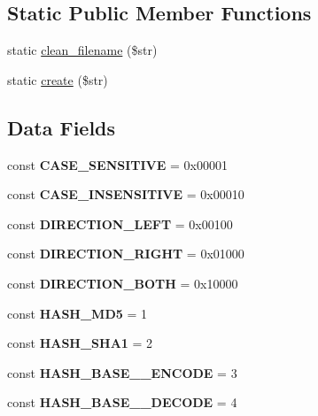 \subsection*{Static Public Member Functions}
\begin{DoxyCompactItemize}
\item 
static \hyperlink{class_string_a0379fa1d2b4237c37dfdec08861d99af}{clean\_\-filename} (\$str)
\item 
static \hyperlink{class_string_a961abbe56dd9e118c04e34b6f1882acb}{create} (\$str)
\end{DoxyCompactItemize}
\subsection*{Data Fields}
\begin{DoxyCompactItemize}
\item 
\hypertarget{class_string_aa0aa4956c348404eafb4c3c56f9b5f39}{
const {\bfseries CASE\_\-SENSITIVE} = 0x00001}
\label{class_string_aa0aa4956c348404eafb4c3c56f9b5f39}

\item 
\hypertarget{class_string_a026a296c95f3ab3b5b8e340396fcb839}{
const {\bfseries CASE\_\-INSENSITIVE} = 0x00010}
\label{class_string_a026a296c95f3ab3b5b8e340396fcb839}

\item 
\hypertarget{class_string_a139cc2d8b5c7daa8d248bc1ad6064b52}{
const {\bfseries DIRECTION\_\-LEFT} = 0x00100}
\label{class_string_a139cc2d8b5c7daa8d248bc1ad6064b52}

\item 
\hypertarget{class_string_af81c309d1263b5697174e60d5ec17278}{
const {\bfseries DIRECTION\_\-RIGHT} = 0x01000}
\label{class_string_af81c309d1263b5697174e60d5ec17278}

\item 
\hypertarget{class_string_a009c53f9b73b984845c4a55b1082168c}{
const {\bfseries DIRECTION\_\-BOTH} = 0x10000}
\label{class_string_a009c53f9b73b984845c4a55b1082168c}

\item 
\hypertarget{class_string_a56854fc2844da8f69ab256cd98245d9b}{
const {\bfseries HASH\_\-MD5} = 1}
\label{class_string_a56854fc2844da8f69ab256cd98245d9b}

\item 
\hypertarget{class_string_ae2edd4bdd282ab84d689621a4d9c699c}{
const {\bfseries HASH\_\-SHA1} = 2}
\label{class_string_ae2edd4bdd282ab84d689621a4d9c699c}

\item 
\hypertarget{class_string_a1a5d516139ee76150e07a8db2293e6e8}{
const {\bfseries HASH\_\-BASE\_\_\-ENCODE} = 3}
\label{class_string_a1a5d516139ee76150e07a8db2293e6e8}

\item 
\hypertarget{class_string_af1cebebde6fc1c92f5b674304ea9a329}{
const {\bfseries HASH\_\-BASE\_\_\-DECODE} = 4}
\label{class_string_af1cebebde6fc1c92f5b674304ea9a329}

\end{DoxyCompactItemize}
